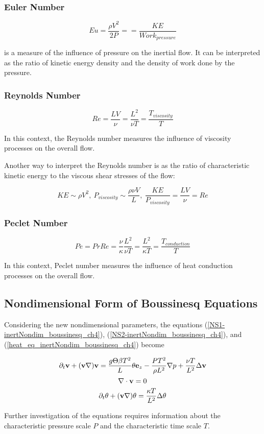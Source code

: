 \subsubsection{Euler Number}

$$ Eu = \frac{\rho V^2}{2P} = = \frac{KE}{Work_{pressure}}$$ 

is a measure of the influence of pressure on the inertial flow. It can be interpreted as the ratio of kinetic energy density and the density of work done by the pressure.

\subsubsection{Reynolds Number}

$$ Re = \frac{LV}{\nu} = \frac{L^2}{\nu T} = \frac{T_{viscosity}}{T} $$

In this context, the Reynolds number measures the influence of viscosity processes on the overall flow.

Another way to interpret the Reynolds number is as the ratio of characteristic kinetic energy to the viscous shear stresses of the flow:

$$ KE \sim \rho V^2,~ P_{viscosity} \sim \frac{\rho \nu V}{L},~ \frac{KE}{P_{viscosity}} = \frac{LV}{\nu} = Re $$

\subsubsection{Peclet Number}

$$ Pe = PrRe = \frac{\nu}{\kappa} \frac{L^2}{\nu T} = \frac{L^2}{\kappa T} = \frac{T_{conduction}}{T} $$

In this context, Peclet number measures the influence of heat conduction processes on the overall flow.

\subsection{Nondimensional Form of Boussinesq Equations}

Considering the new nondimensional parameters,
 the equations (\ref{NS1-inertNondim_boussinesq_ch4}), (\ref{NS2-inertNondim_boussinesq_ch4}), and (\ref{heat_eq_inertNondim_boussinesq_ch4}) become
 
\begin{equation} \label{NS1-inertNondim_boussinesq_vel}
\partial_t\mathbf{v} + (\mathbf{v}\nabla)\mathbf{v} = \frac{g\Theta \beta T^2}{L} \theta \mathbf{e}_z - \frac{PT^2}{\rho L^2} \nabla p + \frac{\nu T}{L^2} \Delta\mathbf{v} 
\end{equation}
\begin{equation} \label{NS2-inertNondim_boussinesq_vel}
\nabla\cdot \mathbf{v} = 0
\end{equation}
\begin{equation} \label{heat_eq_inertNondim_boussinesq_vel}
\partial_t\theta + (\mathbf{v}\nabla)\theta = \frac{\kappa T}{L^2} \Delta\theta  
\end{equation} 

Further investigation of the equations requires information about the characteristic pressure scale $P$ and the characteristic time scale $T$.
